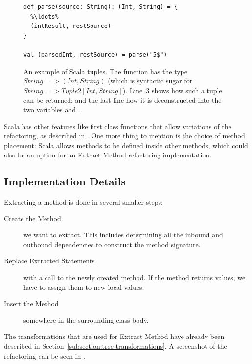 \documentclass[10pt,a4paper,oneside]{scrreprt}
\begin{document}
\begin{figure}
\begin{lstlisting}
def parse(source: String): (Int, String) = {
  %\ldots%
  (intResult, restSource)
}

val (parsedInt, restSource) = parse("5$")
\end{lstlisting}

\caption{An example of Scala tuples. The function  has the type $String => (Int, String)$ (which is syntactic sugar for $String => Tuple2[Int, String]$). Line~3 shows how such a tuple can be returned; and the last line how it is deconstructed into the two variables  and .}
\label{figure:tuple-deconstruction}
\end{figure}

Scala has other features like first class functions that allow variations of the refactoring, as described in \cite{ScalaRefactoring}. One more thing to mention is the choice of method placement: Scala allows methods to be defined inside other methods, which could also be an option for an Extract Method refactoring implementation.

\subsection{Implementation Details}

Extracting a method is done in several smaller steps:

\begin{description}
  \item[Create the Method] we want to extract. This includes determining all the inbound and outbound dependencies to construct the method signature.
  \item[Replace Extracted Statements] with a call to the newly created method. If the method returns values, we have to assign them to new local values.
  \item[Insert the Method] somewhere in the surrounding class body.
\end{description}

The transformations that are used for Extract Method have already been described in Section~\vref{subsection:tree-transformations}. A screenshot of the refactoring can be seen in .
\end{document}
